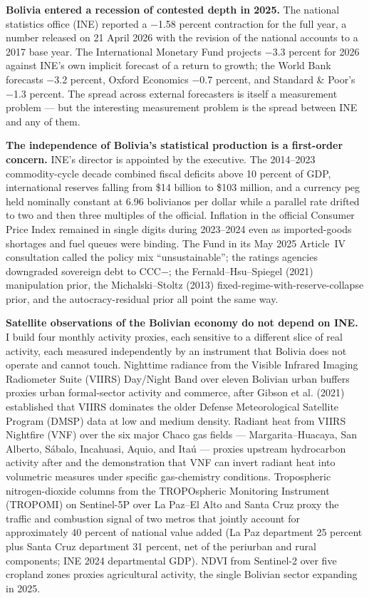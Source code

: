 \documentclass[11pt,letterpaper]{article}
\newcommand{\claim}[1]{\textbf{#1.}}
\begin{document}
\claim{Bolivia entered a recession of contested depth in 2025} The national statistics office (INE) reported a \num{-1.58} percent contraction for the full year, a number released on \num{21} April 2026 with the revision of the national accounts to a 2017 base year. The International Monetary Fund projects \num{-3.3} percent for 2026 against INE's own implicit forecast of a return to growth; the World Bank forecasts \num{-3.2} percent, Oxford Economics \num{-0.7} percent, and Standard \& Poor's \num{-1.3} percent. The spread across external forecasters is itself a measurement problem --- but the interesting measurement problem is the spread between INE and any of them.

\claim{The independence of Bolivia's statistical production is a first-order concern} INE's director is appointed by the executive. The \numrange{2014}{2023} commodity-cycle decade combined fiscal deficits above \num{10} percent of GDP, international reserves falling from \$\num{14} billion to \$\num{103} million, and a currency peg held nominally constant at \num{6.96} bolivianos per dollar while a parallel rate drifted to two and then three multiples of the official. Inflation in the official Consumer Price Index remained in single digits during 2023--2024 even as imported-goods shortages and fuel queues were binding. The Fund in its May 2025 Article~IV consultation called the policy mix ``unsustainable''; the ratings agencies downgraded sovereign debt to CCC$-$; the Fernald--Hsu--Spiegel (2021) manipulation prior, the Michalski--Stoltz (2013) fixed-regime-with-reserve-collapse prior, and the \citet{martinez2022} autocracy-residual prior all point the same way.

\claim{Satellite observations of the Bolivian economy do not depend on INE} I build four monthly activity proxies, each sensitive to a different slice of real activity, each measured independently by an instrument that Bolivia does not operate and cannot touch. Nighttime radiance from the Visible Infrared Imaging Radiometer Suite (VIIRS) Day/Night Band over eleven Bolivian urban buffers proxies urban formal-sector activity and commerce, after Gibson et al. (2021) established that VIIRS dominates the older Defense Meteorological Satellite Program (DMSP) data at low and medium density. Radiant heat from VIIRS Nightfire (VNF) over the six major Chaco gas fields --- Margarita--Huacaya, San Alberto, Sábalo, Incahuasi, Aquio, and Itaú --- proxies upstream hydrocarbon activity after \citet{elvidge_vnf2013} and the \citet{do_etal2018} demonstration that VNF can invert radiant heat into volumetric measures under specific gas-chemistry conditions. Tropospheric nitrogen-dioxide columns from the TROPOspheric Monitoring Instrument (TROPOMI) on Sentinel-5P over La Paz--El Alto and Santa Cruz proxy the traffic and combustion signal of two metros that jointly account for approximately \num{40} percent of national value added (La Paz department \num{25} percent plus Santa Cruz department \num{31} percent, net of the periurban and rural components; INE 2024 departmental GDP). NDVI from Sentinel-2 over five cropland zones proxies agricultural activity, the single Bolivian sector expanding in 2025.
\end{document}
